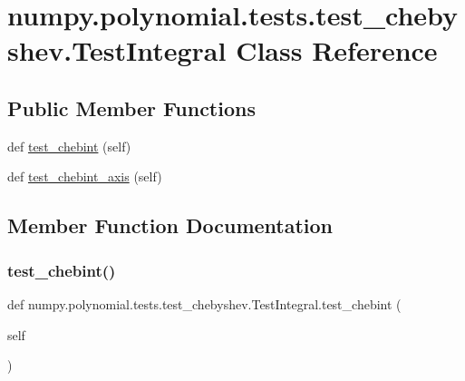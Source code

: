 \hypertarget{classnumpy_1_1polynomial_1_1tests_1_1test__chebyshev_1_1TestIntegral}{}\section{numpy.\+polynomial.\+tests.\+test\+\_\+chebyshev.\+Test\+Integral Class Reference}
\label{classnumpy_1_1polynomial_1_1tests_1_1test__chebyshev_1_1TestIntegral}
\subsection*{Public Member Functions}
\begin{DoxyCompactItemize}
\item 
def \hyperlink{classnumpy_1_1polynomial_1_1tests_1_1test__chebyshev_1_1TestIntegral_a147ac0786486cc88974ad354a6210b64}{test\+\_\+chebint} (self)
\item 
def \hyperlink{classnumpy_1_1polynomial_1_1tests_1_1test__chebyshev_1_1TestIntegral_a209a22c0be337f38f1a5b89aee962d0e}{test\+\_\+chebint\+\_\+axis} (self)
\end{DoxyCompactItemize}


\subsection{Member Function Documentation}
\mbox{\label{classnumpy_1_1polynomial_1_1tests_1_1test__chebyshev_1_1TestIntegral_a147ac0786486cc88974ad354a6210b64}} 
\subsubsection{\texorpdfstring{test\+\_\+chebint()}{test\_chebint()}}
{\footnotesize\ttfamily def numpy.\+polynomial.\+tests.\+test\+\_\+chebyshev.\+Test\+Integral.\+test\+\_\+chebint (\begin{DoxyParamCaption}\item[{}]{self }\end{DoxyParamCaption})}


